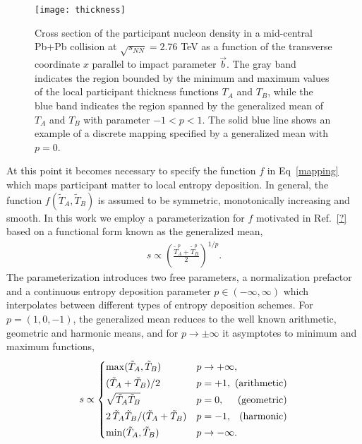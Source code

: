 \documentclass[aps,prc,reprint,amsmath,nofootinbib]{revtex4-1}
\newcommand{\sqrts}{\sqrt{s_{NN}}}
\newcommand{\T}{\tilde{T}}
\begin{document}
\begin{figure}[t]
    \texttt{[image: thickness]}
    \caption{Cross section of the participant nucleon density in a mid-central Pb+Pb collision at $\sqrts=2.76$ TeV as a function of the transverse coordinate $x$ parallel to impact parameter $\vec{b}$. The gray band indicates the region bounded by the minimum and maximum values of the local participant thickness functions $T_A$ and $T_B$, while the blue band indicates the region spanned by the generalized mean of $T_A$ and $T_B$ with parameter $-1<p<1$. The solid blue line shows an example of a discrete mapping specified by a generalized mean with $p=0$.} 
    \label{fig:thickness}
\end{figure}

At this point it becomes necessary to specify the function $f$ in Eq~\eqref{mapping} which maps participant matter to local entropy deposition. In general, the function $f(\T_A, \T_B)$ is assumed to be symmetric, monotonically increasing and smooth. In this work we employ a parameterization for $f$ motivated in Ref.~\ref{?} based on a functional form known as the generalized mean,
\begin{align}
    \label{entropy_propto}
    s \propto \left( \frac{\T_A^p + \T_B^p}{2} \right)^{1/p}.
\end{align}
The parameterization introduces two free parameters, a normalization prefactor and a continuous entropy deposition parameter $p\in(-\infty, \infty)$ which interpolates between different types of entropy deposition schemes. For ${p=(1, 0, -1)}$, the generalized mean reduces to the well known arithmetic, geometric and harmonic means, and for $p\rightarrow \pm\infty$ it asymptotes to minimum and maximum functions,
\begin{equation}
  \label{means}
  \newlength{\extraspace}
  \setlength{\extraspace}{0.5ex}
  s \propto
  \begin{cases}
    \max(\T_A, \T_B) & p \rightarrow +\infty, \\[\extraspace]
    (\T_A + \T_B)/2 & p = +1, \hfill \text{ (arithmetic)} \\[\extraspace]
    \sqrt{\T_A \T_B} & p = 0, \hfill \text{ (geometric)} \\[\extraspace]
    2\, \T_A \T_B/(\T_A + \T_B) & p = -1, \hfill \text{ (harmonic)} \\[\extraspace]
    \min(\T_A, \T_B) & p \rightarrow -\infty.
  \end{cases}
\end{equation}
\end{document}

